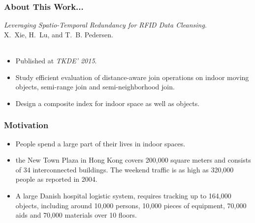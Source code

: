 \begin{frame}
\frametitle{About This Work...}

\emph{Leveraging Spatio-Temporal Redundancy for RFID Data Cleansing}.~\cite{xie2015distance} \\
X.~Xie, H.~Lu, and T.~B. Pedersen.\\~\\

\begin{itemize}
  \item Published at \emph{TKDE' 2015}.
  \item Study efficient evaluation of distance-aware join operations on indoor moving objects, semi-range join and semi-neighborhood join.
  \item Design a composite index for indoor space as well as objects.
\end{itemize}

\end{frame}


\begin{frame}
\frametitle{Motivation}

\begin{itemize}
  \item People spend a large part of their lives in indoor spaces.

  \item the New Town Plaza in Hong Kong covers 200,000 square meters and consists of 34 interconnected buildings. The weekend traffic is as high as 320,000 people as reported in 2004.

  \item A large Danish hospital logistic system, requires tracking up to 164,000 objects, including around 10,000 persons, 10,000 pieces of equipment, 70,000 aids and 70,000 materials over 10 floors.
\end{itemize}

\end{frame}


